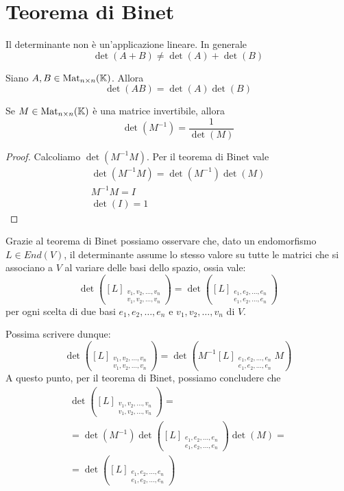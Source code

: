 \section{Teorema di Binet}
Il determinante non è un'applicazione lineare. In generale
\[ \det(A + B) \neq \det(A) + \det(B) \]

\begin{theorem}
	Siano $A, B \in \operatorname{Mat}_{n \times n}(\mathbb{K})$. Allora
	\[
		\det(AB) = \det(A)\det(B)
	\]
\end{theorem}

\begin{corollary}
	Se $M \in \operatorname{Mat}_{n \times n}(\mathbb{K})$ è una matrice invertibile, allora
	\[
		\det(M^{-1}) = \frac{1}{\det(M)}
	\]
	\begin{proof}
		Calcoliamo $\det(M^{-1} M)$. Per il teorema di Binet vale
		\begin{gather*}
			\det(M^{-1} M) = \det(M^{-1})\det(M) \\
			M^{-1}M = I \\
			\det(I) = 1
		\end{gather*}
	\end{proof}
\end{corollary}

Grazie al teorema di Binet possiamo osservare che, dato un endomorfismo
$L \in End(V)$, il determinante assume lo stesso valore su tutte le matrici
che si associano a $V$ al variare delle basi dello spazio, ossia vale:
\[
	\det \left(
	[L]_{\substack{
			v_1, v_2, \dots, v_n \\
			v_1, v_2, \dots, v_n
		}}
	\right) =
	\det \left(
	[L]_{\substack{
			e_1, e_2, \dots, e_n \\
			e_1, e_2, \dots, e_n
		}}
	\right)
\]
per ogni scelta di due basi $e_1, e_2, \dots, e_n$ e $v_1, v_2, \dots, v_n$
di $V$.

Possima scrivere dunque:
\[
	\det \left(
	[L]_{\substack{
			v_1, v_2, \dots, v_n \\
			v_1, v_2, \dots, v_n
		}}
	\right) =
	\det \left(
	M^{-1}[L]_{\substack{
			e_1, e_2, \dots, e_n \\
			e_1, e_2, \dots, e_n
		}} M
	\right)
\]
A questo punto, per il teorema di Binet, possiamo concludere che
\begin{gather*}
	\det \left(
	[L]_{\substack{
			v_1, v_2, \dots, v_n \\
			v_1, v_2, \dots, v_n
		}}
	\right) = \\
	= \det(M^{-1}) \det \left(
	[L]_{\substack{
			e_1, e_2, \dots, e_n \\
			e_1, e_2, \dots, e_n
		}}
	\right) \det(M) = \\
	= \det \left(
	[L]_{\substack{
			e_1, e_2, \dots, e_n \\
			e_1, e_2, \dots, e_n
		}}
	\right)
\end{gather*}

